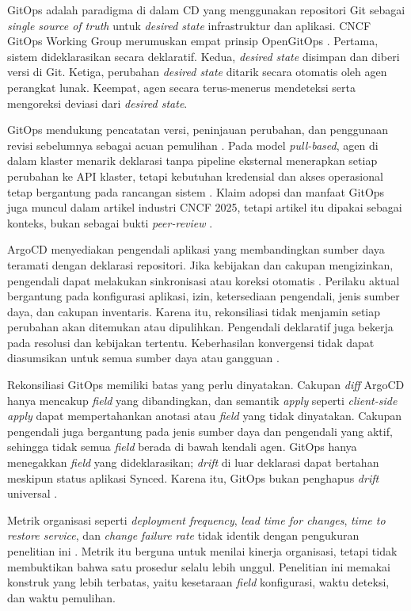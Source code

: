 GitOps adalah paradigma di dalam CD yang menggunakan repositori Git sebagai \textit{single source of truth} untuk \textit{desired state} infrastruktur dan aplikasi. CNCF GitOps Working Group merumuskan empat prinsip OpenGitOps \citep{opengitops2021}. Pertama, sistem dideklarasikan secara deklaratif. Kedua, \textit{desired state} disimpan dan diberi versi di Git. Ketiga, perubahan \textit{desired state} ditarik secara otomatis oleh agen perangkat lunak. Keempat, agen secara terus-menerus mendeteksi serta mengoreksi deviasi dari \textit{desired state}.

GitOps mendukung pencatatan versi, peninjauan perubahan, dan penggunaan revisi sebelumnya sebagai acuan pemulihan \citep{yuen2021gitops}. Pada model \textit{pull-based}, agen di dalam klaster menarik deklarasi tanpa pipeline eksternal menerapkan setiap perubahan ke API klaster, tetapi kebutuhan kredensial dan akses operasional tetap bergantung pada rancangan sistem \citep{utami2021analysis}. Klaim adopsi dan manfaat GitOps juga muncul dalam artikel industri CNCF 2025, tetapi artikel itu dipakai sebagai konteks, bukan sebagai bukti \textit{peer-review} \citep{cncf2025gitops}.

ArgoCD menyediakan pengendali aplikasi yang membandingkan sumber daya teramati dengan deklarasi repositori. Jika kebijakan dan cakupan mengizinkan, pengendali dapat melakukan sinkronisasi atau koreksi otomatis \citep{argocd2024}. Perilaku aktual bergantung pada konfigurasi aplikasi, izin, ketersediaan pengendali, jenis sumber daya, dan cakupan inventaris. Karena itu, rekonsiliasi tidak menjamin setiap perubahan akan ditemukan atau dipulihkan. Pengendali deklaratif juga bekerja pada resolusi dan kebijakan tertentu. Keberhasilan konvergensi tidak dapat diasumsikan untuk semua sumber daya atau gangguan \citep{argocd2024}.

Rekonsiliasi GitOps memiliki batas yang perlu dinyatakan. Cakupan \textit{diff} ArgoCD hanya mencakup \textit{field} yang dibandingkan, dan semantik \textit{apply} seperti \textit{client-side apply} dapat mempertahankan anotasi atau \textit{field} yang tidak dinyatakan. Cakupan pengendali juga bergantung pada jenis sumber daya dan pengendali yang aktif, sehingga tidak semua \textit{field} berada di bawah kendali agen. GitOps hanya menegakkan \textit{field} yang dideklarasikan; \textit{drift} di luar deklarasi dapat bertahan meskipun status aplikasi Synced. Karena itu, GitOps bukan penghapus \textit{drift} universal \citep{argocd2024}.

Metrik organisasi seperti \textit{deployment frequency}, \textit{lead time for changes}, \textit{time to restore service}, dan \textit{change failure rate} tidak identik dengan pengukuran penelitian ini \citep{forsgren2018accelerate}. Metrik itu berguna untuk menilai kinerja organisasi, tetapi tidak membuktikan bahwa satu prosedur selalu lebih unggul. Penelitian ini memakai konstruk yang lebih terbatas, yaitu kesetaraan \textit{field} konfigurasi, waktu deteksi, dan waktu pemulihan.

